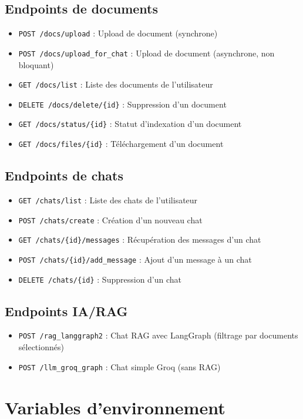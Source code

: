 \subsection{Endpoints de documents}
\begin{itemize}
    \item \texttt{POST /docs/upload} : Upload de document (synchrone)
    \item \texttt{POST /docs/upload\_for\_chat} : Upload de document (asynchrone, non bloquant)
    \item \texttt{GET /docs/list} : Liste des documents de l'utilisateur
    \item \texttt{DELETE /docs/delete/\{id\}} : Suppression d'un document
    \item \texttt{GET /docs/status/\{id\}} : Statut d'indexation d'un document
    \item \texttt{GET /docs/files/\{id\}} : Téléchargement d'un document
\end{itemize}

\subsection{Endpoints de chats}
\begin{itemize}
    \item \texttt{GET /chats/list} : Liste des chats de l'utilisateur
    \item \texttt{POST /chats/create} : Création d'un nouveau chat
    \item \texttt{GET /chats/\{id\}/messages} : Récupération des messages d'un chat
    \item \texttt{POST /chats/\{id\}/add\_message} : Ajout d'un message à un chat
    \item \texttt{DELETE /chats/\{id\}} : Suppression d'un chat
\end{itemize}

\subsection{Endpoints IA/RAG}
\begin{itemize}
    \item \texttt{POST /rag\_langgraph2} : Chat RAG avec LangGraph (filtrage par documents sélectionnés)
    \item \texttt{POST /llm\_groq\_graph} : Chat simple Groq (sans RAG)
\end{itemize}

\section{Variables d'environnement}

